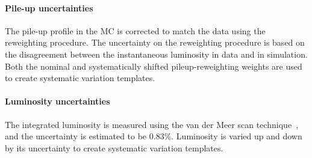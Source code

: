 \paragraph*{Pile-up uncertainties}
The pile-up profile in the MC is corrected to match the data using the reweighting procedure. The uncertainty on the reweighting procedure is based on the disagreement between the instantaneous luminosity in data and in simulation. Both the nominal and systematically shifted pileup-reweighting weights are used to create systematic variation templates.


\paragraph*{Luminosity uncertainties}
The integrated luminosity is measured using the van der Meer scan technique~\cite{ATLAS:2022hro}, and the uncertainty is estimated to be 0.83\%. Luminosity is varied up and down by its uncertainty to create systematic variation templates.

